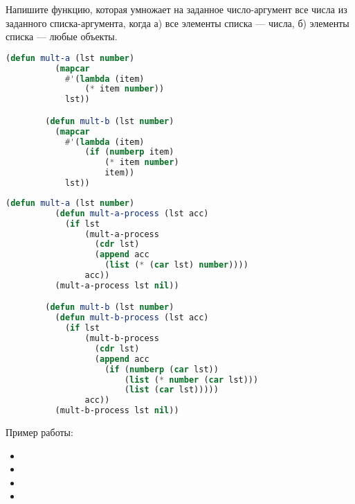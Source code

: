 \documentclass[a4paper,oneside,12pt]{extreport}
\begin{document}
\begin{task}
	Напишите функцию, которая умножает на заданное число-аргумент все числа из заданного списка-аргумента, когда а) все элементы списка — числа, б)  элементы списка — любые объекты.

	\begin{lstlisting}[language=Lisp, gobble=16]
		(defun mult-a (lst number)
		  (mapcar
		    #'(lambda (item)
		        (* item number))
		    lst))

		(defun mult-b (lst number)
		  (mapcar
		    #'(lambda (item)
		        (if (numberp item)
		            (* item number)
		            item))
		    lst))
	\end{lstlisting}

	\begin{lstlisting}[language=Lisp, gobble=16]
		(defun mult-a (lst number)
		  (defun mult-a-process (lst acc)
		    (if lst
		        (mult-a-process
		          (cdr lst)
		          (append acc
		            (list (* (car lst) number))))
		        acc))
		  (mult-a-process lst nil))

		(defun mult-b (lst number)
		  (defun mult-b-process (lst acc)
		    (if lst
		        (mult-b-process
		          (cdr lst)
		          (append acc
		            (if (numberp (car lst))
		                (list (* number (car lst)))
		                (list (car lst)))))
		        acc))
		  (mult-b-process lst nil))
	\end{lstlisting}

	Пример работы:
	\begin{itemize}
		\item {}
		\item {}
		\item {}
		\item {}
	\end{itemize}
\end{task}
\end{document}

